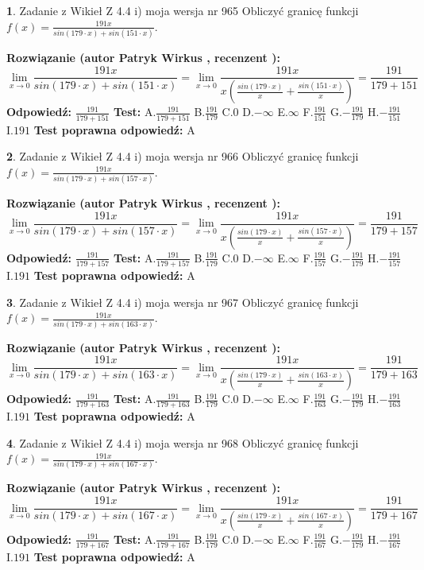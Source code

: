 \documentclass[12pt, a4paper]{article}
\theoremstyle{definition} %
\newtheorem{zad}{}
\newcommand{\zadStart}[1]{\begin{zad}#1\newline}
\newcommand{\zadStop}{\end{zad}}
\newcommand{\rozwStart}[2]{\noindent \textbf{Rozwiązanie (autor #1 , recenzent #2): }\newline}
\newcommand{\rozwStop}{\newline}
\newcommand{\odpStart}{\noindent \textbf{Odpowiedź:}\newline}
\newcommand{\odpStop}{\newline}
\newcommand{\testStart}{\noindent \textbf{Test:}\newline}
\newcommand{\testStop}{\newline}
\newcommand{\kluczStart}{\noindent \textbf{Test poprawna odpowiedź:}\newline}
\newcommand{\kluczStop}{\newline}
\begin{document}
\zadStart{Zadanie z Wikieł Z 4.4 i) moja wersja nr 965}
Obliczyć granicę funkcji $f(x)=\frac{191x}{sin(179\cdot x) +sin(151\cdot x)}$.
\zadStop
\rozwStart{Patryk Wirkus}{}
$$\lim\limits_{x\to 0}\frac{191x}{sin(179\cdot x) +sin(151\cdot x)}=\lim\limits_{x\to 0}\frac{191x}{x(\frac{sin(179\cdot x)}{x}+\frac{sin(151\cdot x)}{x})}=\frac{191}{179+151}$$
\rozwStop
\odpStart
$\frac{191}{179+151}$
\odpStop
\testStart
A.$\frac{191}{179+151}$
B.$\frac{191}{179}$
C.$0$
D.$-\infty$
E.$\infty$
F.$\frac{191}{151}$
G.$-\frac{191}{179}$
H.$-\frac{191}{151}$
I.$191$
\testStop
\kluczStart
A
\kluczStop



\zadStart{Zadanie z Wikieł Z 4.4 i) moja wersja nr 966}
Obliczyć granicę funkcji $f(x)=\frac{191x}{sin(179\cdot x) +sin(157\cdot x)}$.
\zadStop
\rozwStart{Patryk Wirkus}{}
$$\lim\limits_{x\to 0}\frac{191x}{sin(179\cdot x) +sin(157\cdot x)}=\lim\limits_{x\to 0}\frac{191x}{x(\frac{sin(179\cdot x)}{x}+\frac{sin(157\cdot x)}{x})}=\frac{191}{179+157}$$
\rozwStop
\odpStart
$\frac{191}{179+157}$
\odpStop
\testStart
A.$\frac{191}{179+157}$
B.$\frac{191}{179}$
C.$0$
D.$-\infty$
E.$\infty$
F.$\frac{191}{157}$
G.$-\frac{191}{179}$
H.$-\frac{191}{157}$
I.$191$
\testStop
\kluczStart
A
\kluczStop



\zadStart{Zadanie z Wikieł Z 4.4 i) moja wersja nr 967}
Obliczyć granicę funkcji $f(x)=\frac{191x}{sin(179\cdot x) +sin(163\cdot x)}$.
\zadStop
\rozwStart{Patryk Wirkus}{}
$$\lim\limits_{x\to 0}\frac{191x}{sin(179\cdot x) +sin(163\cdot x)}=\lim\limits_{x\to 0}\frac{191x}{x(\frac{sin(179\cdot x)}{x}+\frac{sin(163\cdot x)}{x})}=\frac{191}{179+163}$$
\rozwStop
\odpStart
$\frac{191}{179+163}$
\odpStop
\testStart
A.$\frac{191}{179+163}$
B.$\frac{191}{179}$
C.$0$
D.$-\infty$
E.$\infty$
F.$\frac{191}{163}$
G.$-\frac{191}{179}$
H.$-\frac{191}{163}$
I.$191$
\testStop
\kluczStart
A
\kluczStop



\zadStart{Zadanie z Wikieł Z 4.4 i) moja wersja nr 968}
Obliczyć granicę funkcji $f(x)=\frac{191x}{sin(179\cdot x) +sin(167\cdot x)}$.
\zadStop
\rozwStart{Patryk Wirkus}{}
$$\lim\limits_{x\to 0}\frac{191x}{sin(179\cdot x) +sin(167\cdot x)}=\lim\limits_{x\to 0}\frac{191x}{x(\frac{sin(179\cdot x)}{x}+\frac{sin(167\cdot x)}{x})}=\frac{191}{179+167}$$
\rozwStop
\odpStart
$\frac{191}{179+167}$
\odpStop
\testStart
A.$\frac{191}{179+167}$
B.$\frac{191}{179}$
C.$0$
D.$-\infty$
E.$\infty$
F.$\frac{191}{167}$
G.$-\frac{191}{179}$
H.$-\frac{191}{167}$
I.$191$
\testStop
\kluczStart
A
\kluczStop
\end{document}

